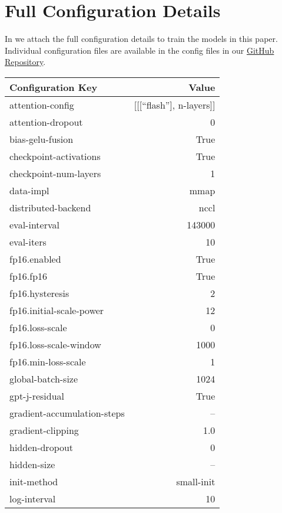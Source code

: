\documentclass{article}
\theoremstyle{plain}
\theoremstyle{definition}
\theoremstyle{remark}
\begin{document}
\clearpage

\section{Full Configuration Details}\label{app:hparam}

In  we attach the full configuration details to train the models in this paper. Individual configuration files are available in the config files in our \href{https://github.com/EleutherAI/pythia}{GitHub Repository}.

\begin{table}[!ht]
\small
\centering
\begin{subtable}[h]{0.48\textwidth}
\begin{tabular}{lr}
    \toprule
    Configuration Key                               & Value \\
    \midrule
    attention-config & [[[``flash''], n-layers]] \\
    attention-dropout & 0 \\
    bias-gelu-fusion & True \\
    checkpoint-activations & True \\
    checkpoint-num-layers & 1 \\
    data-impl & mmap \\
    distributed-backend & nccl \\
    eval-interval & 143000 \\
    eval-iters & 10 \\
    fp16.enabled & True \\
    fp16.fp16 & True \\
    fp16.hysteresis & 2 \\
    fp16.initial-scale-power & 12 \\
    fp16.loss-scale & 0 \\
    fp16.loss-scale-window & 1000 \\
    fp16.min-loss-scale & 1 \\
    global-batch-size & 1024 \\
    gpt-j-residual & True \\
    gradient-accumulation-steps & -- \\
    gradient-clipping & 1.0 \\
    hidden-dropout & 0 \\
    hidden-size & -- \\
    init-method & small-init \\
    log-interval & 10 \\

\end{tabular}
\end{subtable}
\end{table}
\end{document}
